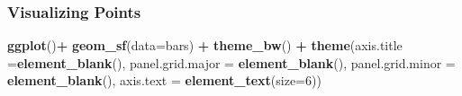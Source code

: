 \documentclass[
  shownotes,
  xcolor={svgnames},
  hyperref={colorlinks,citecolor=DarkBlue,linkcolor=DarkRed,urlcolor=DarkBlue}
   , aspectratio=169]{beamer}
\newenvironment{Shaded}{\begin{snugshade}}{\end{snugshade}}
\newcommand{\DataTypeTok}[1]{\textcolor[rgb]{0.13,0.29,0.53}{#1}}
\newcommand{\DecValTok}[1]{\textcolor[rgb]{0.00,0.00,0.81}{#1}}
\newcommand{\KeywordTok}[1]{\textcolor[rgb]{0.13,0.29,0.53}{\textbf{#1}}}
\newcommand{\NormalTok}[1]{#1}
\newcommand{\OperatorTok}[1]{\textcolor[rgb]{0.81,0.36,0.00}{\textbf{#1}}}
\newcommand{\StringTok}[1]{\textcolor[rgb]{0.31,0.60,0.02}{#1}}
\begin{document}
\begin{frame}[fragile]
\frametitle{Visualizing Points}

\begin{minipage}[t]{0.52\linewidth}
        \begin{scriptsize}
           \begin{Shaded}
            \begin{Highlighting}[]
\KeywordTok{ggplot}\NormalTok{()}\OperatorTok{+}
\StringTok{  }\KeywordTok{geom\_sf}\NormalTok{(}\DataTypeTok{data=}\NormalTok{bars) }\OperatorTok{+}
\StringTok{  }\KeywordTok{theme\_bw}\NormalTok{() }\OperatorTok{+}
\StringTok{  }\KeywordTok{theme}\NormalTok{(}\DataTypeTok{axis.title =}\KeywordTok{element\_blank}\NormalTok{(),}
\DataTypeTok{panel.grid.major =} \KeywordTok{element\_blank}\NormalTok{(),}
\DataTypeTok{panel.grid.minor =} \KeywordTok{element\_blank}\NormalTok{(),}
\DataTypeTok{axis.text =} \KeywordTok{element\_text}\NormalTok{(}\DataTypeTok{size=}\DecValTok{6}\NormalTok{))}
            \end{Highlighting}
            \end{Shaded}
                        

\end{scriptsize}
\end{minipage}
\end{frame}
\end{document}
